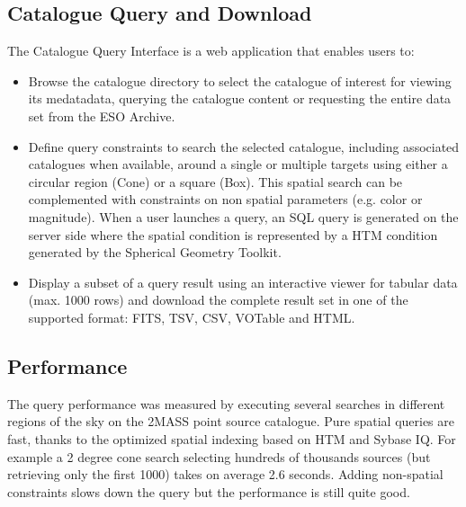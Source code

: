 \subsection{Catalogue Query and Download}
The Catalogue Query Interface is a web application that enables users to:
\begin{itemize}
\item Browse the catalogue directory to select the catalogue of interest for viewing its medatadata, querying the catalogue content or requesting the entire data set from the ESO Archive.
\item Define query constraints to search the selected catalogue, including associated catalogues when available, around a single or multiple targets using either a circular region (Cone) or a square (Box). This spatial search can be complemented with constraints on non spatial parameters (e.g. color or magnitude). When a user launches a query, an SQL query is generated on the server side where the spatial condition is represented by a HTM condition generated by the Spherical Geometry Toolkit.
\item Display a subset of a query result using an interactive viewer for tabular data (max. 1000 rows) and download the complete result set in one of the supported format: FITS, TSV, CSV, VOTable and HTML.
\end{itemize}

\subsection{Performance}
The query performance was measured by executing several searches in different regions of the sky on the 2MASS point source catalogue. Pure spatial queries are fast, thanks to the optimized spatial indexing based on HTM and Sybase IQ. For example a 2 degree cone search selecting hundreds of thousands sources (but retrieving only the first 1000) takes on average 2.6 seconds. Adding non-spatial constraints slows down the query but the performance is still quite good.

